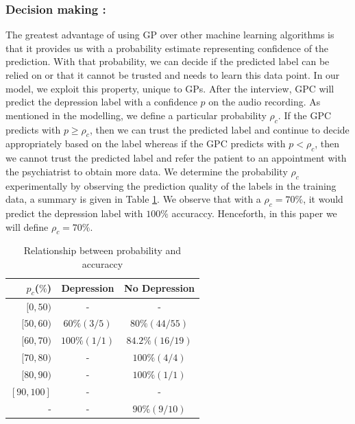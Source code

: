 \documentclass{article}
\begin{document}
	\subsubsection{Decision making :}
	The greatest advantage of using GP over other machine learning algorithms is that it provides us with a probability estimate representing confidence of the prediction. 
	With that probability, we can decide if the predicted label can be relied on or that it cannot be trusted and needs to learn this data point. 
	In our model, we exploit this property, unique to GPs. 
	After the interview, GPC will predict the depression label with a confidence $p$ on the audio recording. 
	As mentioned in the modelling, we define a particular probability $\rho_c$. 
	If the GPC predicts with $p \geq \rho_c$, then we can trust the predicted label and continue to decide appropriately based on the label whereas if the GPC predicts with $p < \rho_c$, then we cannot trust the predicted label and refer the patient to an appointment with the psychiatrist to obtain more data.
	We determine the probability $\rho_c$ experimentally by observing the prediction quality of the labels in the training data, a summary is given in Table \ref{tab:rho}. We observe that with a $\rho_c = 70\%$, it would predict the depression label with $100\%$ accuraccy. 
	Henceforth, in this paper we will define $\rho_c = 70\%$.
	
 	\begin{table}[h]
 		\begin{center}
  			\begin{tabular}{ | r | c | c | }
    			\hline
			 	 \bfseries $p_c$($\%$)	& \bfseries Depression 	& \bfseries No Depression \\ \hline
				 $[0,50)$		& - 				& - 			 			\\ \hline
				 $[50,60)$		& $60\%(3/5)$ 	& $80\%(44/55)$ 	 	\\ \hline 
				 $[60,70)$		& $100\%(1/1)$ & $84.2\%(16/19)$ 	\\ \hline
				 $[70,80)$		& - 				& $100\%(4/4)$		 	\\ \hline
				 $[80,90)$		& - 				& $100\%(1/1)$ 	 	\\ \hline 
				 $[90,100]$		& - 				& - 			 			\\ \hline
				 -					& - 				& $90\%(9/10)$ 		\\ \hline
			 \end{tabular}
		\end{center}
 	\caption{Relationship between probability and accuraccy}
 	\label{tab:rho}
 	\end{table}
\end{document}
